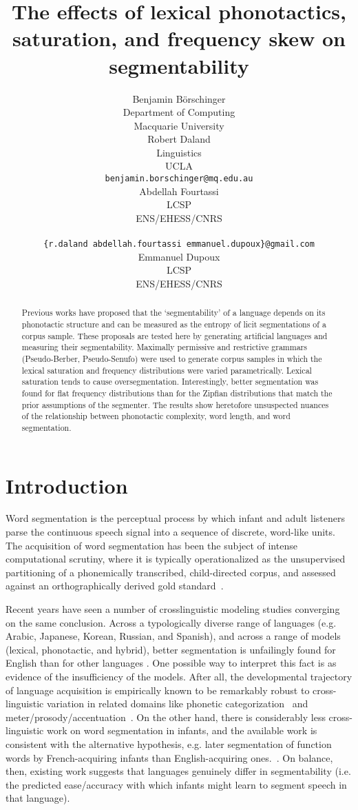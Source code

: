 \documentclass[11pt]{article}
\title{The effects of lexical phonotactics, saturation,
  and frequency skew on segmentability}
\author{Benjamin B{\"o}rschinger \\
    Department of Computing \\
    Macquarie University \\\And
  Robert Daland \\
    Linguistics \\
    UCLA \\
    {\tt benjamin.borschinger@mq.edu.au} \\\And
  Abdellah Fourtassi \\
    LCSP \\
    ENS/EHESS/CNRS \\
    \\
    {\tt \{r.daland\,abdellah.fourtassi\,emmanuel.dupoux\}@gmail.com} \\\And
  Emmanuel Dupoux \\
    LCSP \\
    ENS/EHESS/CNRS }
\date{}
\begin{document}
\maketitle
\begin{abstract}
  Previous works have proposed that the `segmentability' of a language
  depends on its phonotactic structure and can be measured as the
  entropy of licit segmentations of a corpus sample. These proposals
  are tested here by generating artificial languages and measuring
  their segmentability. Maximally permissive and restrictive grammars
  (Pseudo-Berber, Pseudo-Senufo) were used to generate corpus samples 
  in which the lexical saturation and frequency distributions were
  varied parametrically. Lexical saturation tends to cause oversegmentation.
  Interestingly, better segmentation was found for flat frequency
  distributions than for the Zipfian distributions that match the
  prior assumptions of the segmenter. The results show heretofore
  unsuspected nuances of the relationship between phonotactic complexity,
  word length, and word segmentation.
\end{abstract}


\section{Introduction}

Word segmentation is the perceptual process by which infant and adult listeners parse the continuous speech signal into a sequence of discrete, word-like units. The acquisition of word segmentation has been the subject of intense computational scrutiny, where it is typically operationalized as the unsupervised partitioning of a phonemically transcribed, child-directed corpus, and assessed against an orthographically derived gold standard~\cite{Goldwater09a,Daland11a,Pearl10b}.

Recent years have seen a number of crosslinguistic modeling studies converging on the same conclusion. Across a typologically diverse range of languages (e.g. Arabic, Japanese, Korean, Russian, and Spanish), and across a range of models (lexical, phonotactic, and hybrid), better segmentation is unfailingly found for English than for other languages \cite{Fleck08a,Daland09a,Daland11a,Fourtassi13a,Daland13a}. One possible way to interpret this fact is as evidence of the insufficiency of the models. After all, the developmental trajectory of language acquisition is empirically known to be remarkably robust to cross-linguistic variation in related domains like phonetic categorization~\cite{ref} and meter/prosody/accentuation~\cite{ref}. On the other hand, there is considerably less cross-linguistic work on word segmentation in infants, and the available work is consistent with the alternative hypothesis, e.g. later segmentation of function words by French-acquiring infants than English-acquiring ones.~\cite{ref}. On balance, then, existing work suggests that languages genuinely differ in segmentability (i.e. the predicted ease/accuracy with which infants might learn to segment speech in that language).
\end{document}
